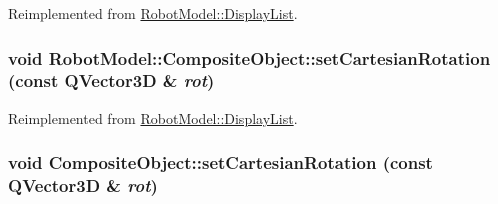 Reimplemented from \hyperlink{class_robot_model_1_1_display_list_a56a652740c494995c0ff55d1a5fd896d}{RobotModel::DisplayList}.\hypertarget{class_robot_model_1_1_composite_object_a2e4886f283bbf8741c41a066241a1e55}{
\subsubsection[{setCartesianRotation}]{\setlength{\rightskip}{0pt plus 5cm}void RobotModel::CompositeObject::setCartesianRotation (const QVector3D \& {\em rot})}}
\label{class_robot_model_1_1_composite_object_a2e4886f283bbf8741c41a066241a1e55}


Reimplemented from \hyperlink{class_robot_model_1_1_display_list_a7d52ea010f54755bcb3bfae9e26dd0c2}{RobotModel::DisplayList}.\hypertarget{class_robot_model_1_1_composite_object_a12e8961ebc63d8a253d915b29b356162}{
\subsubsection[{setCartesianRotation}]{\setlength{\rightskip}{0pt plus 5cm}void CompositeObject::setCartesianRotation (const QVector3D \& {\em rot})}}
\label{class_robot_model_1_1_composite_object_a12e8961ebc63d8a253d915b29b356162}


